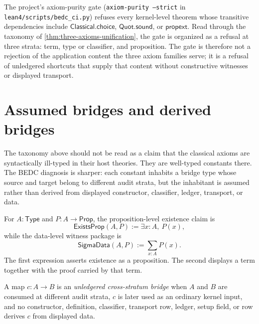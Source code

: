 \begin{remark}
\label{rem:three-axioms-gate-meaning}
The project's axiom-purity gate (\texttt{axiom-purity --strict} in \texttt{lean4/scripts/bedc\_ci.py}) refuses every kernel-level theorem whose transitive dependencies include $\mathsf{Classical.choice}$, $\mathsf{Quot.sound}$, or $\mathsf{propext}$. Read through the taxonomy of \autoref{thm:three-axioms-unification}, the gate is organized as a refusal at three strata: term, type or classifier, and proposition. The gate is therefore not a rejection of the application content the three axiom families serve; it is a refusal of unledgered shortcuts that supply that content without constructive witnesses or displayed transport.
\end{remark}

\section{Assumed bridges and derived bridges}
\label{sec:three-axioms-assumed-derived-bridges}

The taxonomy above should not be read as a claim that the classical axioms
are syntactically ill-typed in their host theories. They are well-typed
constants there. The BEDC diagnosis is sharper: each constant inhabits a
bridge type whose source and target belong to different audit strata, but the
inhabitant is assumed rather than derived from displayed constructor,
classifier, ledger, transport, or \NameCert{} data.

\begin{definition}
\label{def:three-axioms-prop-exists-data-witness}
For $A:\mathsf{Type}$ and $P:A\to\mathsf{Prop}$, the proposition-level
existence claim is
$$
\mathsf{ExistsProp}(A,P):=\exists x:A,\ P(x),
$$
while the data-level witness package is
$$
\mathsf{SigmaData}(A,P):=\sum_{x:A}P(x).
$$
The first expression asserts existence as a proposition. The second displays
a term together with the proof carried by that term.
\end{definition}

\begin{definition}
\label{def:unledgered-cross-stratum-bridge}
A map $c:A\to B$ is an \emph{unledgered cross-stratum bridge} when $A$ and
$B$ are consumed at different audit strata, $c$ is later used as an ordinary
kernel input, and no constructor, definition, classifier, transport row,
ledger, setup field, or \NameCert{} row derives $c$ from displayed data.
\end{definition}

